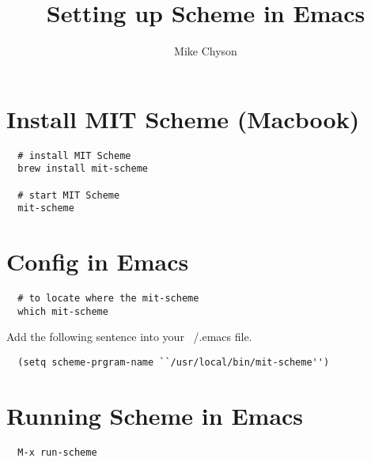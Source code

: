 \documentclass{article}
\begin{document}
\title{Setting up Scheme in Emacs}
\author{Mike Chyson}
\newpage{}

\section{Install MIT Scheme (Macbook)}
\begin{lstlisting}
  # install MIT Scheme
  brew install mit-scheme

  # start MIT Scheme
  mit-scheme
\end{lstlisting}

\section{Config in Emacs}
\begin{lstlisting}
  # to locate where the mit-scheme
  which mit-scheme
\end{lstlisting}

Add the following sentence into your ~/.emacs file.
\begin{lstlisting}
  (setq scheme-prgram-name ``/usr/local/bin/mit-scheme'')
\end{lstlisting}

\section{Running Scheme in Emacs}

\begin{lstlisting}
  M-x run-scheme
\end{lstlisting}
\end{document}
